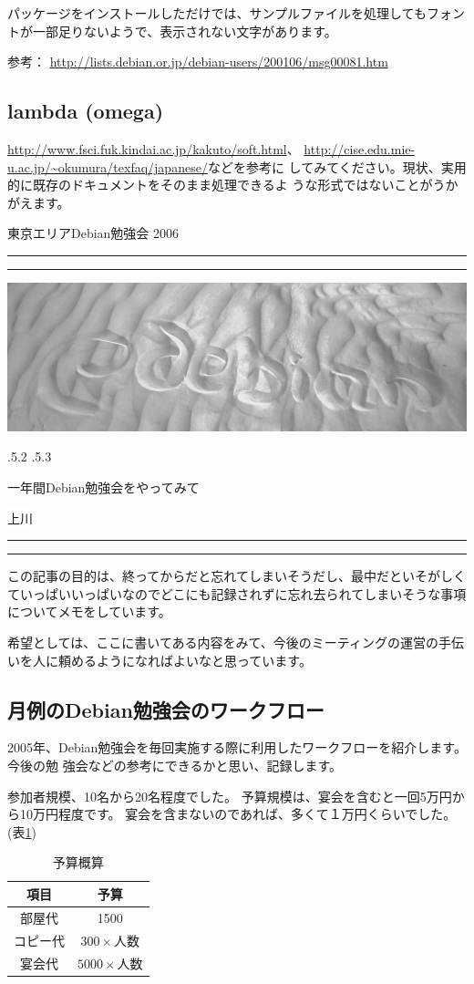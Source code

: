 \documentclass[mingoth,a4paper]{jsarticle}
\makeatletter
\renewcommand{\section}{\@startsection{section}{1}{\z@}%
    {\Cvs \@plus.5\Cdp \@minus.2\Cdp}%
    {.5\Cvs \@plus.3\Cdp}%
    {\normalfont\Huge\headfont\raggedright\centering}} %
\newcommand{\dancersection}[2]{%
\newpage
東京エリアDebian勉強会 2006
\hrule
\vspace{0.5mm}
\hrule
\hfill{}\includegraphics[width=16cm]{image2006-natsu/guruguru-sand-light.png}\\
\vspace{-5cm}
\begin{center}
\section{#1}
\end{center}
\hfill{}\colorbox{white}{#2}\hspace{3cm}\space\\
\vspace{1cm}
\hrule
\vspace{0.5mm}
\hrule
\vspace{1cm}
}
\newcommand{\tbref}[1]{表\ref{#1}}
\makeatother
\begin{document}
パッケージをインストールしただけでは、サンプルファイルを処理してもフォン
トが一部足りないようで、表示されない文字があります。

参考：
\url{http://lists.debian.or.jp/debian-users/200106/msg00081.htm}

\subsection{lambda (omega)}

\url{http://www.fsci.fuk.kindai.ac.jp/kakuto/soft.html}、
\url{http://cise.edu.mie-u.ac.jp/~okumura/texfaq/japanese/}などを参考に
してみてください。現状、実用的に既存のドキュメントをそのまま処理できるよ
うな形式ではないことがうかがえます。



\dancersection{一年間Debian勉強会をやってみて}{上川}
\label{sec:uekawa}

この記事の目的は、終ってからだと忘れてしまいそうだし、最中だといそがしく
ていっぱいいっぱいなのでどこにも記録されずに忘れ去られてしまいそうな事項
についてメモをしています。

希望としては、ここに書いてある内容をみて、今後のミーティングの運営の手伝
いを人に頼めるようになればよいなと思っています。

\subsection{月例のDebian勉強会のワークフロー}

2005年、Debian勉強会を毎回実施する際に利用したワークフローを紹介します。今後の勉
強会などの参考にできるかと思い、記録します。

参加者規模、10名から20名程度でした。
予算規模は、宴会を含むと一回5万円から10万円程度です。
宴会を含まないのであれば、多くて１万円くらいでした。(\tbref{tab:yosan})

\begin{table}[ht]
 \caption{予算概算}\label{tab:yosan}
 \begin{center}
  \begin{tabular}{|c|c|}
  項目 & 予算 \\
 \hline
  部屋代 & 1500 \\
  コピー代 & $ 300 \times \texttt{人数} $ \\
  宴会代 &  $ 5000 \times \texttt{人数}$ \\
  \end{tabular}
 \end{center}
\end{table}
\end{document}
